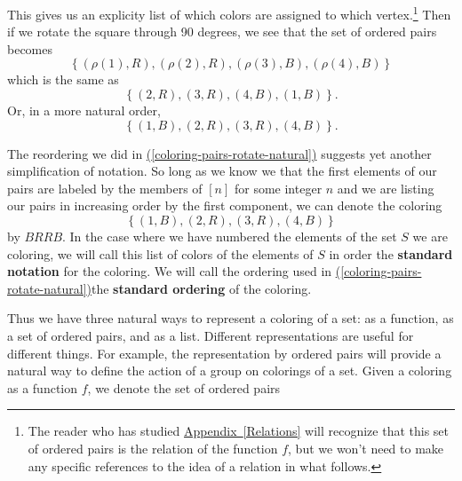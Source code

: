 \documentclass[10pt,]{book}
\newcommand{\terminology}[1]{\textbf{#1}}
\theoremstyle{plain}
\theoremstyle{definition}
\theoremstyle{definition}
\numberwithin{equation}{chapter}
\begin{document}
\hypertarget{p-1613}{}%
This gives us an explicity list of which colors are assigned to which vertex.\footnote{The reader who has studied \hyperref[Relations]{Appendix~\ref{Relations}} will recognize that this set of ordered pairs is the relation of the function \(f\), but we won't need to make any specific references to the idea of a relation in what follows.\label{fn-22}} Then if we rotate the square through 90 degrees, we see that the set of ordered pairs becomes%
\begin{equation}
\left\{(\rho(1),R),(\rho(2),R),(\rho(3),B),(\rho(4),B)\right\}\label{coloring-pairs-rotate}
\end{equation}
which is the same as%
\begin{equation*}
\left\{(2,R),(3,R),(4,B),(1,B)\right\}\text{.}
\end{equation*}
Or, in a more natural order,%
\begin{equation}
\left\{(1,B),(2,R),(3,R),(4,B)\right\}\text{.}\label{coloring-pairs-rotate-natural}
\end{equation}
%
\par
\hypertarget{p-1614}{}%
The reordering we did in \hyperref[coloring-pairs-rotate-natural]{(\ref{coloring-pairs-rotate-natural})} suggests yet another simplification of notation. So long as we know we that the first elements of our pairs are labeled by the members of \([n]\) for some integer \(n\) and we are listing our pairs in increasing order by the first component, we can denote the coloring%
\begin{equation*}
\left\{(1,B),(2,R),(3,R),(4,B)\right\}
\end{equation*}
by \(BRRB\). In the case where we have numbered the elements of the set \(S\) we are coloring, we will call this list of colors of the elements of \(S\) in order the \terminology{standard notation} for the coloring. We will call the ordering used in \hyperref[coloring-pairs-rotate-natural]{(\ref{coloring-pairs-rotate-natural})}the \terminology{standard ordering} of the coloring. %
\par
\hypertarget{p-1615}{}%
Thus we have three natural ways to represent a coloring of a set: as a function, as a set of ordered pairs, and as a list. Different representations are useful for different things. For example, the representation by ordered pairs will provide a natural way to define the action of a group on colorings of a set. Given a coloring as a function \(f\), we denote the set of ordered pairs%
\end{document}
